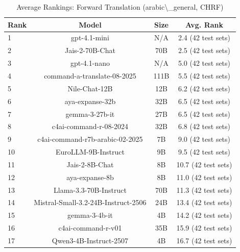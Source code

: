 \begin{table}[htbp]
\centering
\caption{Average Rankings: Forward Translation (arabic\textbackslash{}_general, CHRF)}
\label{tab:avg_rankings_chrf_arabic_general}
\begin{tabular}{l@{\hspace{3pt}}c@{\hspace{3pt}}c@{\hspace{3pt}}c}
\toprule
Rank & Model & Size & Avg. Rank \\
\midrule
1 & gpt-4.1-mini & N/A & 2.4 (42 test sets) \\
2 & Jais-2-70B-Chat & 70B & 2.5 (42 test sets) \\
3 & gpt-4.1-nano & N/A & 5.0 (42 test sets) \\
4 & command-a-translate-08-2025 & 111B & 5.5 (42 test sets) \\
5 & Nile-Chat-12B & 12B & 6.2 (42 test sets) \\
6 & aya-expanse-32b & 32B & 6.5 (42 test sets) \\
7 & gemma-3-27b-it & 27B & 6.5 (42 test sets) \\
8 & c4ai-command-r-08-2024 & 32B & 6.8 (42 test sets) \\
9 & c4ai-command-r7b-arabic-02-2025 & 7B & 9.0 (42 test sets) \\
10 & EuroLLM-9B-Instruct & 9B & 9.5 (42 test sets) \\
11 & Jais-2-8B-Chat & 8B & 10.7 (42 test sets) \\
12 & aya-expanse-8b & 8B & 11.0 (42 test sets) \\
13 & Llama-3.3-70B-Instruct & 70B & 11.3 (42 test sets) \\
14 & Mistral-Small-3.2-24B-Instruct-2506 & 24B & 13.4 (42 test sets) \\
15 & gemma-3-4b-it & 4B & 14.2 (42 test sets) \\
16 & c4ai-command-r-v01 & 35B & 15.9 (42 test sets) \\
17 & Qwen3-4B-Instruct-2507 & 4B & 16.7 (42 test sets) \\
\bottomrule
\end{tabular}
\end{table}
